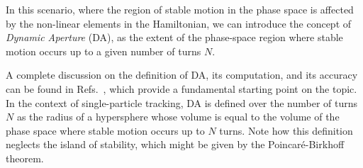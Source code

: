 In this scenario, where the region of stable motion in the phase space is affected by the non-linear elements in the Hamiltonian, we can introduce the concept of \textit{Dynamic Aperture} (DA), as the extent of the phase-space region where stable motion occurs up to a given number of turns $N$.

A complete discussion on the definition of DA, its computation, and its accuracy can be found in Refs.~\cite{PhysRevE.53.4067, invlog}, which provide a fundamental starting point on the topic. In the context of single-particle tracking, DA is defined over the number of turns $N$ as the radius of a hypersphere whose volume is equal to the volume of the phase space where stable motion occurs up to $N$ turns. Note how this definition neglects the island of stability, which might be given by the Poincaré-Birkhoff theorem.

